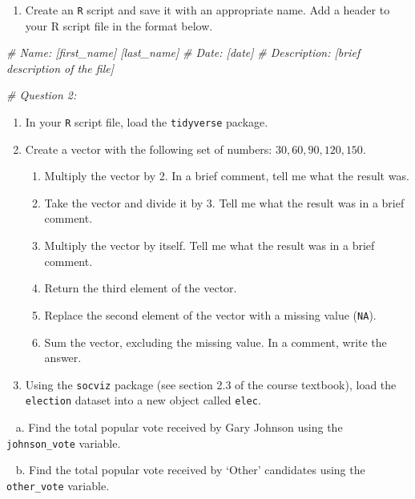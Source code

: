 \documentclass[
]{book}
\newenvironment{Shaded}{\begin{snugshade}}{\end{snugshade}}
\newcommand{\CommentTok}[1]{\textcolor[rgb]{0.56,0.35,0.01}{\textit{#1}}}
\providecommand{\tightlist}{%
  \setlength{\itemsep}{0pt}\setlength{\parskip}{0pt}}
\begin{document}
\begin{enumerate}
\def\labelenumi{\arabic{enumi}.}
\tightlist
\item
  Create an \texttt{R} script and save it with an appropriate name. Add a header to your R script file in the format below.
\end{enumerate}

\begin{Shaded}
\begin{Highlighting}[]
\CommentTok{\# Name: [first\_name] [last\_name]}
\CommentTok{\# Date: [date]}
\CommentTok{\# Description: [brief description of the file] }

\CommentTok{\# Question 2:}
\end{Highlighting}
\end{Shaded}

\begin{enumerate}
\def\labelenumi{\arabic{enumi}.}
\setcounter{enumi}{1}
\item
  In your \texttt{R} script file, load the \texttt{tidyverse} package.
\item
  Create a vector with the following set of numbers: \({30, 60, 90, 120, 150}\).

  \begin{enumerate}
  \def\labelenumii{\alph{enumii}.}
  \item
    Multiply the vector by 2. In a brief comment, tell me what the result was.
  \item
    Take the vector and divide it by 3. Tell me what the result was in a brief comment.
  \item
    Multiply the vector by itself. Tell me what the result was in a brief comment.
  \item
    Return the third element of the vector.
  \item
    Replace the second element of the vector with a missing value (\texttt{NA}).
  \item
    Sum the vector, excluding the missing value. In a comment, write the answer.
  \end{enumerate}
\item
  Using the \texttt{socviz} package (see section 2.3 of the course textbook), load the \texttt{election} dataset into a new object called \texttt{elec}.
\end{enumerate}

~ a. Find the total popular vote received by Gary Johnson using the \texttt{johnson\_vote} variable.

~ b. Find the total popular vote received by `Other' candidates using the \texttt{other\_vote} variable.
\end{document}
